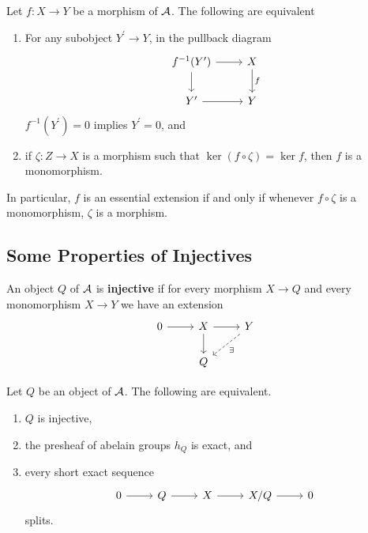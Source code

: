 \documentclass[dissertation.tex]{subfiles}
\begin{document}
\begin{prop}
  Let $f : X \rightarrow Y$ be a morphism of $\mathcal{A}$.
  The following are equivalent
  \begin{enumerate}
  \item
    For any subobject $Y^\prime \rightarrow Y$, in the pullback diagram
    $$\begin{tikzcd}
      f^{-1}(Y^\prime) \arrow{r}\arrow{d} & X\arrow{d}{f}\\
      Y^\prime \arrow{r} & Y
    \end{tikzcd}$$
    $f^{-1}(Y^\prime) = 0$ implies $Y^\prime = 0$, and
  \item
    if $\zeta : Z \rightarrow X$ is a morphism such that $\ker{(f \circ \zeta)} = \ker{f}$, then $f$ is a monomorphism.
  \end{enumerate}
  In particular, $f$ is an essential extension if and only if whenever $f \circ\zeta$ is a monomorphism, $\zeta$ is a morphism.
\end{prop}

\subsection{Some Properties of Injectives}

\begin{defn}
  An object $Q$ of $\mathcal{A}$ is \textbf{injective} if for every morphism $X \to Q$ and every monomorphism $X \to Y$ we have an extension
  $$\begin{tikzcd}
    0 \arrow{r} & X\arrow{d} \arrow{r} & Y \arrow[dashed]{ld}{\exists}\\
    & Q
  \end{tikzcd}$$
\end{defn}

\begin{prop}\label{prop: characterization of injectives}
  Let $Q$ be an object of $\mathcal{A}$.
  The following are equivalent.
  \begin{enumerate}
  \item
    $Q$ is injective,
  \item
    the presheaf of abelain groups $h_Q$ is exact, and
  \item
    every short exact sequence
    $$\begin{tikzcd}
      0 \arrow{r} & Q \arrow{r} & X \arrow{r} & X/Q \arrow{r} & 0
    \end{tikzcd}$$
    splits.
  \end{enumerate}
\end{prop}
\end{document}
